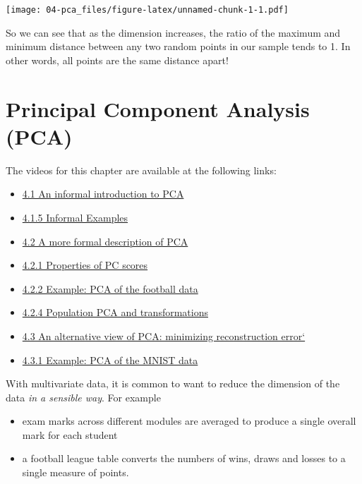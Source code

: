 \documentclass[]{book}
\providecommand{\tightlist}{%
  \setlength{\itemsep}{0pt}\setlength{\parskip}{0pt}}
\theoremstyle{definition}
\theoremstyle{definition}
\theoremstyle{definition}
\theoremstyle{remark}
\begin{document}
\texttt{[image: 04-pca\_files/figure-latex/unnamed-chunk-1-1.pdf]}

So we can see that as the dimension increases, the ratio of the maximum and minimum distance between any two random points in our sample tends to 1. In other words, all points are the same distance apart!

\hypertarget{pca}{%
\chapter{Principal Component Analysis (PCA)}\label{pca}}

The videos for this chapter are available at the following links:

\begin{itemize}
\tightlist
\item
  \href{https://mediaspace.nottingham.ac.uk/media/PCA_Informal/1_zs9dumou}{4.1 An informal introduction to PCA}
\item
  \href{https://mediaspace.nottingham.ac.uk/media/PCA+Informal+Examples/1_3c9ghrtf}{4.1.5 Informal Examples}
\item
  \href{https://mediaspace.nottingham.ac.uk/media/PCA+Formal+Description/1_tq8tpcn0}{4.2 A more formal description of PCA}
\item
  \href{https://mediaspace.nottingham.ac.uk/media/PCAA+Properties+\%28edited\%29/1_vax8yhp9}{4.2.1 Properties of PC scores}
\item
  \href{https://mediaspace.nottingham.ac.uk/media/PCA+Football+Example/1_h70vgqq2}{4.2.2 Example: PCA of the football data}
\item
  \href{https://mediaspace.nottingham.ac.uk/media/Population+PCA+and+transformations/1_y1s2arei}{4.2.4 Population PCA and transformations}
\item
  \href{https://mediaspace.nottingham.ac.uk/media/PCAA+Minimizing+Reconstruction+Error/1_93tzf0ju}{4.3 An alternative view of PCA: minimizing reconstruction error`}
\item
  \href{https://mediaspace.nottingham.ac.uk/media/PCAA+MNIST+example/1_ljte3zc1}{4.3.1 Example: PCA of the MNIST data}
\end{itemize}

With multivariate data, it is common to want to reduce the dimension of the data \emph{in a sensible way}. For example

\begin{itemize}
\item
  exam marks across different modules are
  averaged to produce a single overall mark for each
  student
\item
  a football league table converts the
  numbers of wins, draws and losses to a single measure of
  points.
\end{itemize}
\end{document}
